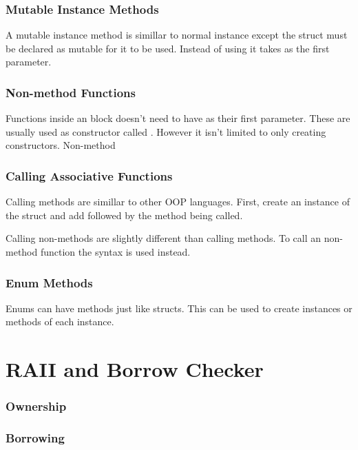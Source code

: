 \documentclass{beamer}
\begin{document}
\begin{frame}
  \frametitle{Mutable Instance Methods}
  A mutable instance method is simillar to normal instance except the struct must be declared as mutable for it to be used. Instead of using  it takes  as the first parameter.
  
\end{frame}

\begin{frame}
  \frametitle{Non-method Functions}
  Functions inside an  block doesn't need to have  as their first parameter. These are usually used as constructor called . However it isn't limited to only creating constructors. Non-method
  
\end{frame}

\begin{frame}[allowframebreaks]
  \frametitle{Calling Associative Functions}
  Calling methods are simillar to other OOP languages. First, create an instance of the struct and add  followed by the method being called.
  

  \pagebreak

  Calling non-methods are slightly different than calling methods. To call an non-method function the \inlinecode{::} syntax is used instead.
  
\end{frame}

\begin{frame}[fragile]
  \frametitle{Enum Methods}
  Enums can have methods just like structs. This can be used to create instances or methods of each instance.

  
\end{frame}

\section{RAII and Borrow Checker}
\begin{frame}
  \frametitle{Ownership}

\end{frame}

\begin{frame}
  \frametitle{Borrowing}

\end{frame}
\end{document}
